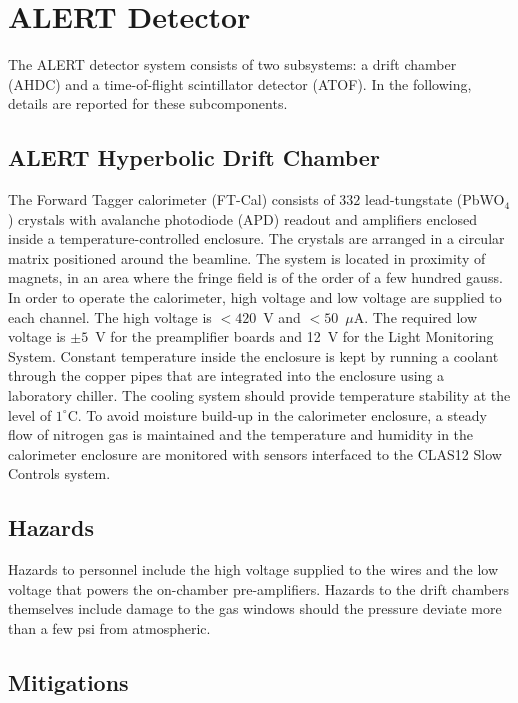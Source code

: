 \section{ALERT Detector}

The ALERT detector system consists of two subsystems: a drift chamber (AHDC) and a time-of-flight
scintillator detector (ATOF). In the following, details are reported for these subcomponents.

\subsection{ALERT Hyperbolic Drift Chamber}

The Forward Tagger calorimeter (FT-Cal) consists of $332$ lead-tungstate (PbWO$_4$) crystals 
with avalanche photodiode (APD) readout and amplifiers enclosed inside a temperature-controlled 
enclosure. The crystals are arranged in a circular matrix positioned around the beamline. The 
system is located in proximity of magnets, in an area where the fringe field is of the order of 
a few hundred gauss. In order to operate the calorimeter, high voltage and low voltage are 
supplied to each channel. The high voltage is $<420$~V and $<50$~$\mu$A. The required low voltage 
is $\pm 5$~V for the preamplifier boards and 12~V for the Light Monitoring System. Constant 
temperature inside the enclosure is kept by running a coolant through the copper pipes that 
are integrated into the enclosure using a laboratory chiller. The cooling system should provide 
temperature stability at the level of $1^\circ$C. To avoid moisture build-up in the calorimeter 
enclosure, a steady flow of nitrogen gas is maintained and the temperature and humidity in the 
calorimeter enclosure are monitored with sensors interfaced to the CLAS12 Slow Controls system.

\subsection{Hazards} 

Hazards to personnel include the high voltage supplied to the wires and the low voltage that 
powers the on-chamber pre-amplifiers. Hazards to the drift chambers themselves include damage 
to the gas windows should the pressure deviate more than a few psi from atmospheric. 

\subsection{Mitigations}

